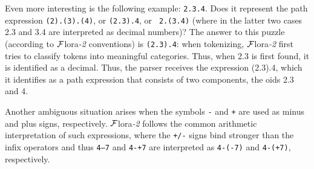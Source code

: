 \documentclass[11pt]{article}
\newcommand{\FLSYSTEM}{{\mbox{\sc ${\cal F}${lora}\rm\emph{-2}}}\xspace}
\begin{document}
Even more interesting is the following example: {\tt 2.3.4}. Does it
represent the path expression {\tt (2).(3).(4)}, or {\tt (2.3).4}, or {\tt
  2.(3.4)} (where in the latter two cases 2.3 and 3.4 are interpreted as
decimal numbers)? The answer to this puzzle (according to \FLSYSTEM conventions)
is {\tt (2.3).4}: when
tokenizing, \FLSYSTEM first tries to classify tokens into meaningful
categories. Thus, when 2.3 is first found, it is identified as a
decimal. Thus, the parser receives the expression (2.3).4, which it
identifies as a path expression that consists of two components, the oids
2.3 and 4.

Another ambiguous situation arises when the symbols {\tt -} and {\tt +} are
used as minus and plus
signs, respectively. \FLSYSTEM follows the common arithmetic interpretation of
such expressions, where the {\tt +/-} signs bind stronger than the infix
operators and thus
{\tt 4--7} and {\tt 4-+7} are interpreted as {\tt 4-(-7)} and {\tt 4-(+7)},
respectively.
\end{document}
